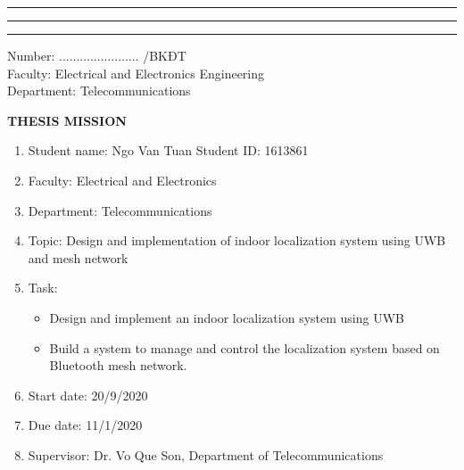 \documentclass[\main/main.tex]{subfiles}
\begin{document}
\graphicspath{{imgs/}{00_misc/imgs/}}


\rule{\textwidth}{1pt}
\begin{minipage}{0.45\textwidth}
    \vspace{3mm}
    \begin{center}
        \fontsize{7}{12}\selectfont{VIETNAM NATIONAL UNIVERSITY HO CHI MINH CITY\\
                 HO CHI MINH CITY UNIVERSITY OF TECHNOLOGY\\}
    \rule{\textwidth}{1pt}
    \end{center}
\end{minipage}
\hfill
\begin{minipage}{0.45\textwidth}
    \vspace{3mm}
    \begin{center}
        \fontsize{7}{12}\selectfont{SOCIALIST REPUBLIC OF VIETNAM\\
    INDEPENDENCE-FREEDOM-HAPPINESS\\}
    \rule{\textwidth}{1pt}
    \end{center}
\end{minipage}

\begin{flushleft}
    \parbox[t][1.5cm]{10cm}
    {
        Number: ....................... /BKĐT \\
        Faculty: Electrical and Electronics Engineering \\
        Department: Telecommunications
    }
\end{flushleft}

\vspace{3mm}
\begin{center}
    \textbf{THESIS MISSION}
\end{center}
\vspace{3mm}

\begin{enumerate}
    \item Student name: Ngo Van Tuan \hspace{3cm} Student ID: 1613861
    \item Faculty: Electrical and Electronics
    \item Department: Telecommunications
    \item Topic: Design and implementation of indoor localization system using UWB and mesh network 
    \item Task: \begin{itemize}
        \item Design and implement an indoor localization system using UWB
        \item Build a system to manage and control the localization system based on Bluetooth mesh network.
    \end{itemize}
    \item Start date: 20/9/2020
    \item Due date: 11/1/2020
    \item Supervisor: Dr. Vo Que Son, Department of Telecommunications
\end{enumerate}
\end{document}
